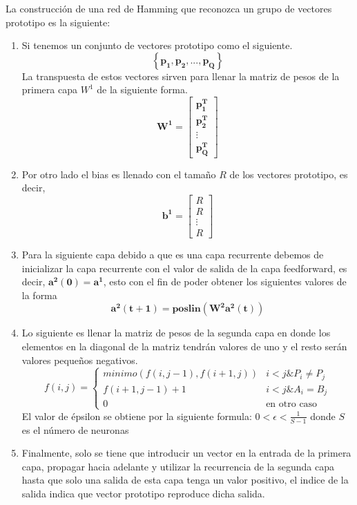 \documentclass[12pt, titlepage]{article}
\begin{document}
    La construcción de una red de Hamming que reconozca un grupo de vectores prototipo es la siguiente:
    \begin{enumerate}
        \item Si tenemos un conjunto de vectores prototipo como el siguiente.
        \[ \left\lbrace \boldsymbol{p_1, p_2, ..., p_Q} \right\rbrace  \]
        La transpuesta de estos vectores sirven para llenar la matriz de pesos de la primera capa $W^1$ de la siguiente forma.
        \[\boldsymbol{ W^{1}} = \left[\begin{array}{c}\boldsymbol{p^{T}_1}\\\boldsymbol{ p^{T}_2}\\ \vdots \\ \boldsymbol{p^{T}_Q}\end{array}\right]  \]
        \item Por otro lado el bias es llenado con el tamaño $R$ de los vectores prototipo, es decir,
        \[ \boldsymbol{b^{1}} = \left[\begin{array}{c}R\\ R\\ \vdots \\ R\end{array}\right] \]
        \item Para la siguiente capa debido a que es una capa recurrente debemos de inicializar la capa recurrente con el valor de salida de la capa feedforward, es decir, $\boldsymbol{a^2(0) = a^1}$, esto con el fin de poder obtener los siguientes valores de la forma 
        \[  \boldsymbol{a^2(t+1) = poslin(W^2a^2(t))}\]
        \item Lo siguiente es llenar la matriz de pesos de la segunda capa en donde los elementos en la diagonal de la matriz tendrán valores de uno y el resto serán valores pequeños negativos.
        \[ f(i, j) = 
        \begin{cases} 
        minimo(f(i, j-1), f(i+1, j)) & i < j \mathbin{\&}  P_{i} \ne  P_{j} \\
        f(i+1, j-1) + 1 & i < j  \mathbin{\&}  A_{i} =  B_{j} \\
        0 & \text{en otro caso}
        \end{cases} \]
        El valor de épsilon se obtiene por la siguiente formula: $ 0 < \epsilon <\frac{1}{S-1}$ donde $S$ es el número de neuronas
        \item Finalmente, solo se tiene que introducir un vector en la entrada de la primera capa, propagar hacia adelante y utilizar la recurrencia de la segunda capa hasta que solo una salida de esta capa tenga un valor positivo, el indice de la salida indica que vector prototipo reproduce dicha salida.
    \end{enumerate}
\newpage
\end{document}
